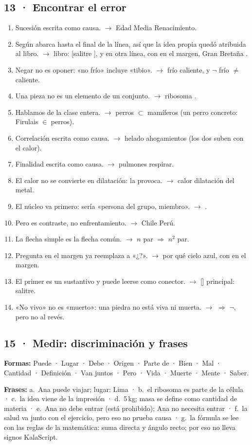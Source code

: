 \documentclass[11pt,a4paper]{article}
\newcounter{ejercicio}
\newcommand{\Sol}[1]{\textbf{#1}}
\begin{document}
\clearpage
\subsection*{13 · Encontrar el error}
\begin{enumerate}\small
\item Sucesión escrita como causa. \(\to\) Edad Media  Renacimiento.
\item Según abarca hasta el final de la línea, así que la idea propia quedó atribuida al libro. \(\to\)  libro: [salitre  ], y en otra línea, con  en el margen, Gran Bretaña  .
\item Negar no es oponer: «no frío» incluye «tibio». \(\to\) frío  caliente, y \(\neg\) frío \(\neq\) caliente.
\item Una pieza no es un elemento de un conjunto. \(\to\) ribosoma  .
\item Hablamos de la clase entera. \(\to\) perros \(\subset\) mamíferos (un perro concreto: Firulais \(\in\) perros).
\item Correlación escrita como causa. \(\to\) helado  ahogamientos (los dos suben con el calor).
\item Finalidad escrita como causa. \(\to\) pulmones  respirar.
\item El calor no se convierte en dilatación: la provoca. \(\to\) calor  dilatación del metal.
\item El núcleo va primero:  sería «persona del grupo, miembro». \(\to\) .
\item Pero es contraste, no enfrentamiento. \(\to\) Chile  Perú.
\item La flecha simple es la flecha común. \(\to\) \(n\) par \(\Rightarrow\) \(n^2\) par.
\item Pregunta en el margen ya reemplaza a «¿?». \(\to\) por qué cielo azul, con  en el margen.
\item El primer  es un sustantivo y puede leerse como conector. \(\to\) [] principal: salitre.
\item «No vivo» no es «muerto»: una piedra no está viva ni muerta. \(\to\)  \(\Rightarrow\) \(\neg\), pero no al revés.
\end{enumerate}

\subsection*{15 · Medir: discriminación y frases}
{\small\Sol{Formas:} Puede · Lugar · Debe · Origen · Parte de · Bien · Mal ·
Cantidad · Definición · Van juntos · Pero · Vida · Muerte · Mente · Saber.\par
\Sol{Frases:} a.~Ana puede viajar; lugar: Lima · b.~el ribosoma es parte de la
célula · c.~la idea viene de la impresión · d.~5\,kg; masa se define como
cantidad de materia · e.~Ana no debe entrar (está prohibido); Ana no necesita
entrar · f.~la salud va junto con el ejercicio, pero eso no prueba causa ·
g.~la fórmula se lee con las reglas de la matemática: suma directa y ángulo
recto; por eso no lleva signos KalaScript.}
\end{document}
